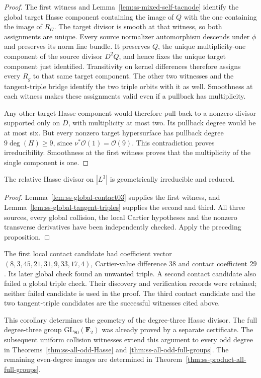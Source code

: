 \begin{proof}
The first witness and Lemma~\ref{lem:ss-mixed-self-tacnode} identify
the global target Hasse component containing the image of $Q$ with
the one containing the image of $R_G$. The target divisor is smooth
at that witness, so both assignments are unique. Every source
normalizer automorphism descends under $\phi$ and preserves its
norm line bundle. It preserves $Q$, the unique multiplicity-one
component of the source divisor $D^2Q$, and hence fixes the unique
target component just identified. Transitivity on kernel differences
therefore assigns every $R_g$ to that same target component.
The other two witnesses and the tangent-triple bridge identify the
two triple orbits with it as well. Smoothness at each witness makes
these assignments valid even if a pullback has multiplicity.

Any other target Hasse component would therefore pull back to a
nonzero divisor supported only on $D$, with multiplicity at most two.
Its pullback degree would be at most six. But every nonzero target
hypersurface has pullback degree $9\deg(H)\ge9$, since
$\nu^*\mathcal O(1)=\mathcal O(9)$. This contradiction proves
irreducibility. Smoothness at the first witness proves that the
multiplicity of the single component is one.
\end{proof}

\begin{corollary}
\label{cor:ss-degree3-hasse-irreducible}
The relative Hasse divisor on $|L^3|$ is geometrically irreducible
and reduced.
\end{corollary}
\begin{proof}
Lemma~\ref{lem:ss-global-contact03} supplies the first witness, and
Lemma~\ref{lem:ss-global-tangent-triples} supplies the second and
third. All three sources, every global collision, the local
Cartier hypotheses and the nonzero transverse derivatives have
been independently checked. Apply the preceding proposition.
\end{proof}

\begin{remark}\label{auto:A_monodromy:1e009f1c7aa8}

The first local contact candidate had coefficient vector
$(8,3,45,21,31,9,33,17,4)$, Cartier-value difference $38$ and
contact coefficient $29$. Its later global check found an unwanted
triple. A second contact candidate also failed a global triple
check. Their discovery and verification records were retained;
neither failed candidate is used in the proof. The third contact
candidate and the two tangent-triple candidates are the successful
witnesses cited above.

This corollary determines the geometry of the degree-three Hasse
divisor. The full degree-three group $\mathrm{GL}_{80}(\mathbf F_2)$
was already proved by a separate certificate. The subsequent uniform collision witnesses extend this argument to
every odd degree in Theorems~\ref{thm:ss-all-odd-Hasse} and
\ref{thm:ss-all-odd-full-groups}. The remaining even-degree images are determined in
Theorem~\ref{thm:ss-product-all-full-groups}.
\end{remark}


